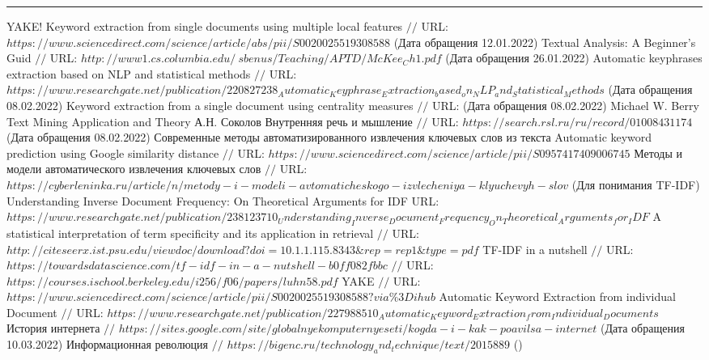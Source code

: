 \makeatletter \renewcommand{} \makeatother
\renewcommand\refname{Список использованных источников}
\begin{thebibliography}{00}
	\hrule	
	
	YAKE! Keyword extraction from single documents using multiple local features $//$ URL: $https://www.sciencedirect.com/science/article/abs/pii/S0020025519308588$ (Дата обращения 12.01.2022)
	Textual Analysis: A Beginner's Guid  $//$ URL: $http://www1.cs.columbia.edu/~sbenus/Teaching/APTD/McKee_Ch1.pdf$ (Дата обращения 26.01.2022)
	Automatic keyphrases extraction based on NLP  and statistical methods $//$ URL: $https://www.researchgate.net/publication/220827238_Automatic_Keyphrase_Extraction_based_on_NLP_and_Statistical_Methods$ (Дата обращения 08.02.2022)
	Keyword extraction from a single document using centrality measures $//$ URL:  (Дата обращения 08.02.2022)
	Michael W. Berry Text Mining Application and Theory
	А.Н. Соколов Внутренняя речь и мышление $//$ URL: $https://search.rsl.ru/ru/record/01008431174$ (Дата обращения 08.02.2022)
	Современные методы автоматизированного извлечения ключевых слов из текста
	Automatic keyword prediction using Google similarity distance $//$ URL: $https://www.sciencedirect.com/science/article/pii/S0957417409006745$
	Методы и модели автоматического извлечения ключевых слов $//$ URL: $https://cyberleninka.ru/article/n/metody-i-modeli-avtomaticheskogo-izvlecheniya-klyuchevyh-slov$
	(Для понимания TF-IDF) Understanding Inverse Document Frequency: On Theoretical Arguments for IDF URL: $https://www.researchgate.net/publication/238123710_Understanding_Inverse_Document_Frequency_On_Theoretical_Arguments_for_IDF$
	A statistical interpretation of term specificity and its application in retrieval $//$ URL: $http://citeseerx.ist.psu.edu/viewdoc/download?doi=10.1.1.115.8343\&rep=rep1\&type=pdf$
	TF-IDF in a nutshell $//$ URL: $https://towardsdatascience.com/tf-idf-in-a-nutshell-b0ff082fbbc$
	 $//$ URL: $https://courses.ischool.berkeley.edu/i256/f06/papers/luhn58.pdf$
	YAKE $//$ URL: $https://www.sciencedirect.com/science/article/pii/S0020025519308588?via\%3Dihub$
	Automatic Keyword Extraction from individual Document
	$//$ URL: $https://www.researchgate.net/publication/227988510_Automatic_Keyword_Extraction_from_Individual_Documents$
	История интернета $//$ $https://sites.google.com/site/globalnyekomputernyeseti/kogda-i-kak-poavilsa-internet$ (Дата обращения 10.03.2022)
	Информационная революция $//$ $https://bigenc.ru/technology_and_technique/text/2015889$ ()
\end{thebibliography}
